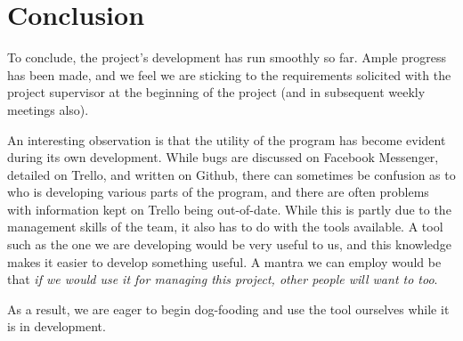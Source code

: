 \documentclass[draft, 10pt]{article}
\begin{document}
\section{Conclusion}\par
To conclude, the project's development has run smoothly so far. Ample progress has been made, and we feel we are sticking to the requirements solicited with the project supervisor at the beginning of the project (and in subsequent weekly meetings also). \par
An interesting observation is that the utility of the program has become evident during its own development. While bugs are discussed on Facebook Messenger, detailed on Trello, and written on Github, there can sometimes be confusion as to who is developing various parts of the program, and there are often problems with information kept on Trello being out-of-date. While this is partly due to the management skills of the team, it also has to do with the tools available. A tool such as the one we are developing would be very useful to us, and this knowledge makes it easier to develop something useful. A mantra we can employ would be that \emph{if we would use it for managing this project, other people will want to too}. \par
As a result, we are eager to begin dog-fooding and use the tool ourselves while it is in development.
\end{document}
